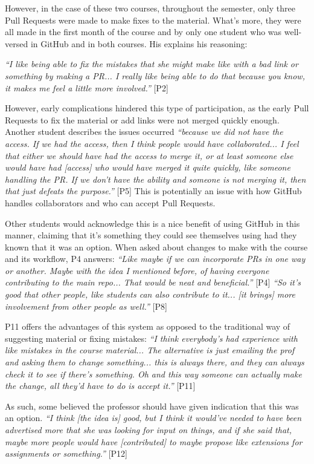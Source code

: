 However, in the case of these two courses, throughout the semester, only three Pull Requests were made to make fixes to the material. What's more, they were all made in the first month of the course and by only one student who was well-versed in GitHub and in both courses. His explains his reasoning:

\textit{``I like being able to fix the mistakes that she might make like with a bad link or something by making a PR... I really like being able to do that because you know, it makes me feel a little more involved.''} [P2]

However, early complications hindered this type of participation, as the early Pull Requests to fix the material or add links were not merged quickly enough. Another student describes the issues occurred \textit{``because we did not have the access. If we had the access, then I think people would have collaborated... I feel that either we should have had the access to merge it, or at least someone else would have had [access] who would have merged it quite quickly, like someone handling the PR. If we don't have the ability and someone is not merging it, then that just defeats the purpose.''} [P5] This is potentially an issue with how GitHub handles collaborators and who can accept Pull Requests.

Other students would acknowledge this is a nice benefit of using GitHub in this manner, claiming that it's something they could see themselves using had they known that it was an option. When asked about changes to make with the course and its workflow, P4 answers: \textit{``Like maybe if we can incorporate PRs in one way or another. Maybe with the idea I mentioned before, of having everyone contributing to the main repo... That would be neat and beneficial.''} [P4] \textit{``So it's good that other people, like students can also contribute to it... [it brings] more involvement from other people as well.''} [P8]

P11 offers the advantages of this system as opposed to the traditional way of suggesting material or fixing mistakes: \textit{``I think everybody's had experience with like mistakes in the course material... The alternative is just emailing the prof and asking them to change something... this is always there, and they can always check it to see if there's something. Oh and this way someone can actually make the change, all they'd have to do is accept it.''} [P11]

As such, some believed the professor should have given indication that this was an option. \textit{``I think [the idea is] good, but I think it would've needed to have been advertised more that she was looking for input on things, and if she said that, maybe more people would have [contributed] to maybe propose like extensions for assignments or something.''} [P12]

